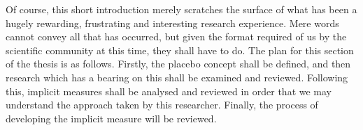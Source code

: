 Of course, this short introduction merely scratches the surface of what has been a hugely rewarding, frustrating and interesting research experience. Mere words cannot convey all that has occurred, but given the format required of us by the scientific community at this time, they shall have to do. The plan for this section of the thesis is as follows. Firstly, the placebo concept shall be defined, and then research which has a bearing on this shall be examined and reviewed. Following this, implicit measures shall be analysed and reviewed in order that we may understand the approach taken by this researcher. Finally, the process of developing the implicit measure will be reviewed. 

